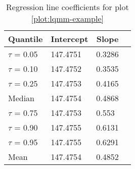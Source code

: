 %
\begin{table}[h]
\caption{Regression line coefficients for plot \ref{plot:lqmm-example}}
\begin{center}
\begin{tabular}{llll}
\hline\hline
\multicolumn{1}{c}{Quantile}&\multicolumn{1}{c}{Intercept}&\multicolumn{1}{c}{Slope}\tabularnewline
\hline
$\tau$ = 0.05&147.4751&0.3286\tabularnewline
$\tau$ = 0.10&147.4752&0.3535\tabularnewline
$\tau$ = 0.25&147.4753&0.4165\tabularnewline
Median&147.4754&0.4868\tabularnewline
$\tau$ = 0.75&147.4753&0.553\tabularnewline
$\tau$ = 0.90&147.4755&0.6131\tabularnewline
$\tau$ = 0.95&147.4755&0.6291\tabularnewline
Mean&147.4754&0.4852\tabularnewline
\hline
\end{tabular}
\end{center}
\label{table:lqmm-example}
\end{table}

